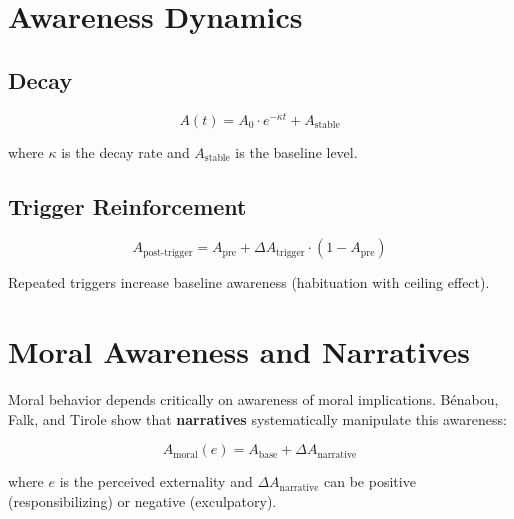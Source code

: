 \section{Awareness Dynamics}
\label{sec:aware-dynamics}

\subsection{Decay}

\begin{equation}
A(t) = A_0 \cdot e^{-\kappa t} + A_{\text{stable}}
\end{equation}

where $\kappa$ is the decay rate and $A_{\text{stable}}$ is the baseline level.

\subsection{Trigger Reinforcement}

\begin{equation}
A_{\text{post-trigger}} = A_{\text{pre}} + \Delta A_{\text{trigger}} \cdot (1 - A_{\text{pre}})
\end{equation}

Repeated triggers increase baseline awareness (habituation with ceiling effect).

\section{Moral Awareness and Narratives}
\label{sec:aware-moral-narratives}

\begin{tcolorbox}[colback=orange!5!white, colframe=orange!75!black,
    title=Moral Awareness: How Narratives Shape Perception of Consequences]

Moral behavior depends critically on awareness of moral implications. Bénabou, Falk, and Tirole \citep{benabou_2018_narratives} show that \textbf{narratives} systematically manipulate this awareness:

\begin{equation}
A_{\text{moral}}(e) = A_{\text{base}} + \Delta A_{\text{narrative}}
\label{eq:moral-awareness}
\end{equation}

where $e$ is the perceived externality and $\Delta A_{\text{narrative}}$ can be positive (responsibilizing) or negative (exculpatory).

\end{tcolorbox}


